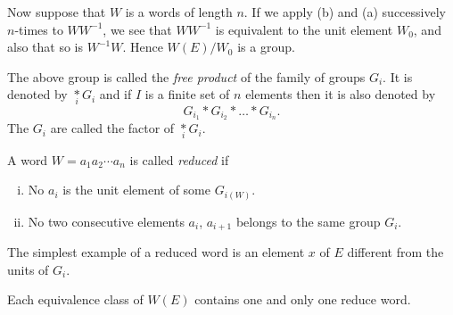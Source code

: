Now suppose that $W$ is a words of length $n$. If we apply (b) and (a)
successively $n$-times to $WW^{-1}$, we see that $WW^{-1}$ is equivalent
to the unit element $W_0$, and also that so is $W^{-1}W$. Hence
$W(E)/W_0$ is a group. 

The above group is called the \textit{free product} of the family of
groups $G_i$. It is denoted by $\underset{i}{\ast}G_i$ and if $I$ is a
finite set of $n$ elements then it is also denoted by  
$$
G_{i_1} \ast G_{i_2} \ast  \ldots  \ast G_{i_n}.
$$\pageoriginale
The $G_i$ are called the factor of $\underset{i}{\ast} G_i$.

\begin{defi*}
A word $W=a_1 a_2 \cdots a_n$ is called {\em reduced} if  
\begin{enumerate}[(i)]
\item No $a_i$ is the unit element of some $G_{i(W)}$. 

\item No two consecutive elements $a_i$, $a_{i+1}$ belongs to the same
  group $G_i$.
\end{enumerate}

The simplest example of a reduced word is an element
 $x$ of $E$ different from the units of $G_i$. 
\end{defi*}

\begin{theorem}\label{thm2.1}%
Each equivalence class of $W(E)$ contains one and only one reduce word.
\end{theorem}

